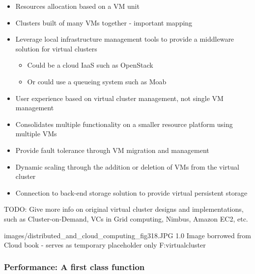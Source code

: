 \cite{wu2014synchronization}

\begin{itemize}
\item Resources allocation based on a VM unit
\item Clusters built of many VMs together - important mapping
\item Leverage local infrastructure management tools to provide a middleware solution for virtual clusters
	\begin{itemize}
	\item Could be a cloud IaaS such as OpenStack
	\item Or could use a queueing system such as Moab
	\end{itemize}
\item User experience based on virtual cluster management, not single VM management
\item Consolidates multiple functionality on a smaller resource platform using multiple VMs
\item Provide fault tolerance through VM migration and management
\item Dynamic scaling through the addition or deletion of VMs from the virtual cluster
\item Connection to back-end storage solution to provide virtual persistent storage
\end{itemize}

TODO: Give more info on original virtual cluster designs and implementations, such as Cluster-on-Demand, VCs in Grid computing, Nimbus, Amazon EC2, etc.


  {images/distributed_and_cloud_computing_fig318.JPG}
  {1.0}
  {Image borrowed from Cloud book - serves as temporary placeholder only}
  {F:virtualcluster}

\subsubsection{Performance: A first class function}


